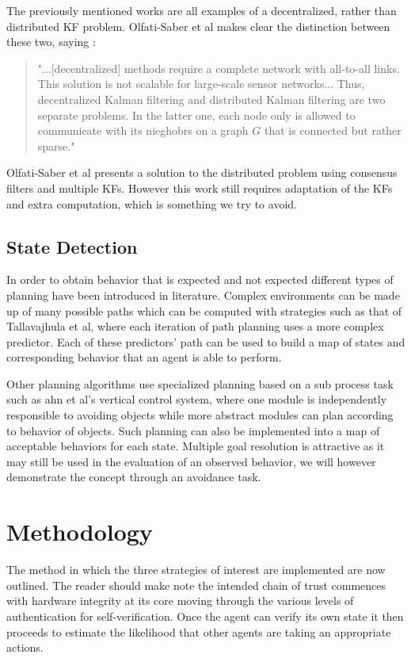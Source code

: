 \documentclass[conference]{IEEEtran}
\begin{document}
The previously mentioned works are all examples of a decentralized, rather than distributed KF problem. Olfati-Saber et al makes clear the distinction between these two, saying \cite{Olfati-Saber2005}:
\begin{quote}"...[decentralized] methods require a complete network with all-to-all links. This solution is not scalable for large-scale sensor networks... Thus, decentralized Kalman filtering and distributed Kalman filtering are two separate problems. In the latter one, each node only is allowed to communicate with its nieghobrs on a graph $G$ that is connected but rather sparse."
\end{quote}
Olfati-Saber et al presents a solution to the distributed problem using consensus filters and multiple KFs\cite{Olfati-Saber2005}. However this work still requires adaptation of the KFs and extra computation, which is something we try to avoid.

\subsection{State Detection}

In order to obtain behavior that is expected and not expected different types of planning have been introduced in literature. Complex environments can be made up of many possible paths which can be computed with strategies such as that of Tallavajhula et al, where each iteration of path planning uses a more complex predictor\cite{tallavajhula2016list}. Each of these predictors' path can be used to build a map of states and corresponding behavior that an agent is able to perform. 

Other planning algorithms use specialized planning based on a sub process task such as ahn et al's vertical control system, where one module is independently responsible to avoiding objects while more abstract modules can plan according to behavior of objects\cite{ahn2008robust}. Such planning can also be implemented into a map of acceptable behaviors for each state. Multiple goal resolution is attractive as it may still be used in the evaluation of an observed behavior, we will however demonstrate the concept through an avoidance task.

\section{Methodology}

The method in which the three strategies of interest are implemented are now outlined. The reader should make note the intended chain of trust commences with hardware integrity at its core moving through the various levels of authentication for self-verification. 
Once the agent can verify its own state it then proceeds to estimate the likelihood that other agents are taking an appropriate actions. 
\end{document}
